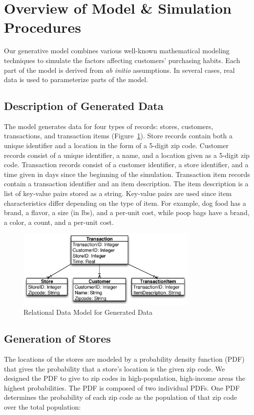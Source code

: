\documentclass[conference]{IEEEtran}
\begin{document}
\section{Overview of Model \& Simulation Procedures}
Our generative model combines various well-known mathematical modeling techniques to simulate the factors affecting customers' purchasing habits.  Each part of the model is derived from \emph{ab initio} assumptions.  In several cases, real data is used to parameterize parts of the model. 

\subsection{Description of Generated Data}
The model generates data for four types of records: stores, customers, transactions, and transaction items (Figure~\ref{fig:relational-data-model}).  Store records contain both a unique identifier and a location in the form of a 5-digit zip code. Customer records consist of a unique identifier, a name, and a location given as a 5-digit zip code. Transaction records consist of a customer identifier, a store identifier, and a time given in days since the beginning of the simulation. Transaction item records contain a transaction identifier and an item description.  The item description is a list of key-value pairs stored as a string.  Key-value pairs are used since item characteristics differ depending on the type of item.  For example, dog food has a brand, a flavor, a size (in lbs), and a per-unit cost, while poop bags have a brand, a color, a count, and a per-unit cost.

\begin{figure}[!t]
  \centering
  \includegraphics[width=3.5in]{figures/transactions_data_model.eps}
  \caption{Relational Data Model for Generated Data}
  \label{fig:relational-data-model}
\end{figure}

\subsection{Generation of Stores}
The locations of the stores are modeled by a probability density function (PDF) that gives the probability that a store's location is the given zip code. We designed the PDF to give to zip codes in high-population, high-income areas the highest probabilities. The PDF is composed of two individual PDFs. One PDF determines the probability of each zip code as the population of that zip code over the total population:
\end{document}
